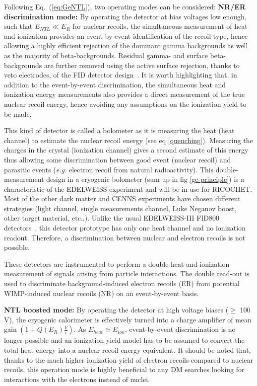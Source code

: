 Following Eq.~(\ref{eq:GeNTL}), two operating modes can  be considered:
{\bf NR/ER discrimination mode:} By operating the detector at bias voltages low enough, such that $E_{NTL} \ll E_R$ for nuclear recoils, the simultaneous measurement of heat and ionization provides an event-by-event identification of the recoil type, hence allowing a highly efficient rejection of the dominant gamma backgrounds as well as the majority of beta-backgrounds. Residual gamma- and surface beta-backgrounds are further removed using the active surface rejection, thanks to veto electrodes, of the FID detector design~\cite{Armengaud:2017rzu}. It is worth highlighting  that, in addition to the event-by-event discrimination, the simultaneous heat and ionization energy measurements also provides a direct measurement of the true nuclear recoil energy, hence avoiding any assumptions on the ionization yield to be made. 

This kind of detector is called a bolometer as it is measuring the heat (heat channel) to estimate the nuclear recoil energy (see eq \ref{quenching}). Measuring the charges in the crystal (ionization channel) gives a second estimate of this energy thus allowing some discrimination between good event (nuclear recoil) and parasitic events ({\em e.g.} electron recoil from natural radioactivity). 
This double-measurement design in a cryogenic bolometer (sum up in fig \ref{ge-principle}) is a characteristic of the EDELWEISS experiment and will be in use for RICOCHET. Most of the other dark matter and CENNS experiments have chosen different strategies (light channel, single measurements channel, Luke Neganov boost, other target material, etc..).
Unlike the usual EDELWEISS-III FID800 detectors~\cite{Armengaud:2017rzu}, this detector prototype has only one heat channel and no ionization readout. Therefore, a discrimination between nuclear and electron recoils is not possible. 

These detectors are instrumented to perform a double heat-and-ionization measurement of signals arising from particle interactions. The double read-out is used to discriminate background-induced electron recoils (ER) from potential WIMP-induced nuclear recoils (NR) on an event-by-event basis.

{\bf NTL boosted mode:} By operating the detector at high voltage biases ($\geq$ 100 V), the cryogenic calorimeter is effectively turned into a charge amplifier of mean gain $(1+Q(E_R)\frac{V}{\epsilon})$. As $E_{heat} \simeq E_{ion}$, event-by-event discrimination is no longer possible and an ionization yield model has to be assumed to convert the total heat energy into a nuclear recoil energy equivalent. It should be noted that, thanks to the much higher ionization yield of electron recoils compared to nuclear recoils, this operation mode is highly beneficial to any DM searches looking for interactions with the electrons instead of nuclei.  

